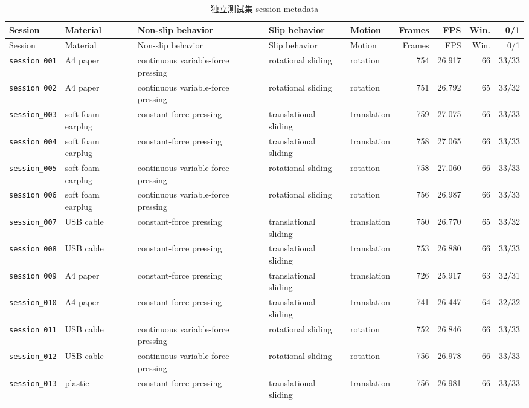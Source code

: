 \documentclass[UTF8,a4paper,11pt]{ctexart}
\begin{document}
\begin{longtable}{lp{1.55cm}p{2.7cm}p{2.65cm}lrrrr}
\caption{独立测试集 session metadata}\\
\toprule
Session & Material & Non-slip behavior & Slip behavior & Motion & Frames & FPS & Win. & 0/1 \\
\midrule
\endfirsthead
\toprule
Session & Material & Non-slip behavior & Slip behavior & Motion & Frames & FPS & Win. & 0/1 \\
\midrule
\endhead
\texttt{session\_001} & A4 paper & continuous variable-force pressing & rotational sliding & rotation & 754 & 26.917 & 66 & 33/33 \\
\texttt{session\_002} & A4 paper & continuous variable-force pressing & rotational sliding & rotation & 751 & 26.792 & 65 & 33/32 \\
\texttt{session\_003} & soft foam earplug & constant-force pressing & translational sliding & translation & 759 & 27.075 & 66 & 33/33 \\
\texttt{session\_004} & soft foam earplug & constant-force pressing & translational sliding & translation & 758 & 27.065 & 66 & 33/33 \\
\texttt{session\_005} & soft foam earplug & continuous variable-force pressing & rotational sliding & rotation & 758 & 27.060 & 66 & 33/33 \\
\texttt{session\_006} & soft foam earplug & continuous variable-force pressing & rotational sliding & rotation & 756 & 26.987 & 66 & 33/33 \\
\texttt{session\_007} & USB cable & constant-force pressing & translational sliding & translation & 750 & 26.770 & 65 & 33/32 \\
\texttt{session\_008} & USB cable & constant-force pressing & translational sliding & translation & 753 & 26.880 & 66 & 33/33 \\
\texttt{session\_009} & A4 paper & constant-force pressing & translational sliding & translation & 726 & 25.917 & 63 & 32/31 \\
\texttt{session\_010} & A4 paper & constant-force pressing & translational sliding & translation & 741 & 26.447 & 64 & 32/32 \\
\texttt{session\_011} & USB cable & continuous variable-force pressing & rotational sliding & rotation & 752 & 26.846 & 66 & 33/33 \\
\texttt{session\_012} & USB cable & continuous variable-force pressing & rotational sliding & rotation & 756 & 26.978 & 66 & 33/33 \\
\texttt{session\_013} & plastic & constant-force pressing & translational sliding & translation & 756 & 26.981 & 66 & 33/33 \\

\end{longtable}
\end{document}
